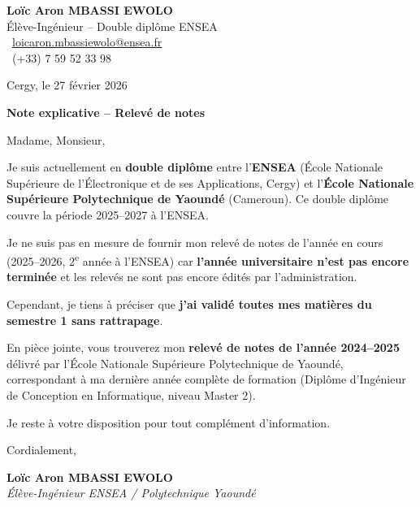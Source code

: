 \documentclass[a4paper,11pt]{article}
\begin{document}
\noindent
\begin{minipage}[t]{0.5\textwidth}
    \textbf{Loïc Aron MBASSI EWOLO}\\
    Élève-Ingénieur -- Double diplôme ENSEA\\[3pt]
    \faEnvelope\ \href{mailto:loicaron.mbassiewolo@ensea.fr}{loicaron.mbassiewolo@ensea.fr}\\
    \faPhone\ (+33) 7 59 52 33 98
\end{minipage}
\hfill
\begin{minipage}[t]{0.4\textwidth}
    \raggedleft
    Cergy, le 27 février 2026
\end{minipage}

\vspace{1.5cm}

\begin{center}
    {\Large \textbf{Note explicative -- Relevé de notes}}
\end{center}

\vspace{1cm}

Madame, Monsieur,

Je suis actuellement en \textbf{double diplôme} entre l'\textbf{ENSEA} (École Nationale Supérieure de l'Électronique et de ses Applications, Cergy) et l'\textbf{École Nationale Supérieure Polytechnique de Yaoundé} (Cameroun). Ce double diplôme couvre la période 2025--2027 à l'ENSEA.

Je ne suis pas en mesure de fournir mon relevé de notes de l'année en cours (2025--2026, 2\textsuperscript{e} année à l'ENSEA) car \textbf{l'année universitaire n'est pas encore terminée} et les relevés ne sont pas encore édités par l'administration.

Cependant, je tiens à préciser que \textbf{j'ai validé toutes mes matières du semestre 1 sans rattrapage}.

En pièce jointe, vous trouverez mon \textbf{relevé de notes de l'année 2024--2025} délivré par l'École Nationale Supérieure Polytechnique de Yaoundé, correspondant à ma dernière année complète de formation (Diplôme d'Ingénieur de Conception en Informatique, niveau Master 2).

Je reste à votre disposition pour tout complément d'information.

\vspace{1cm}

Cordialement,

\vspace{0.6cm}

\textbf{Loïc Aron MBASSI EWOLO}\\
\textit{Élève-Ingénieur ENSEA / Polytechnique Yaoundé}
\end{document}
